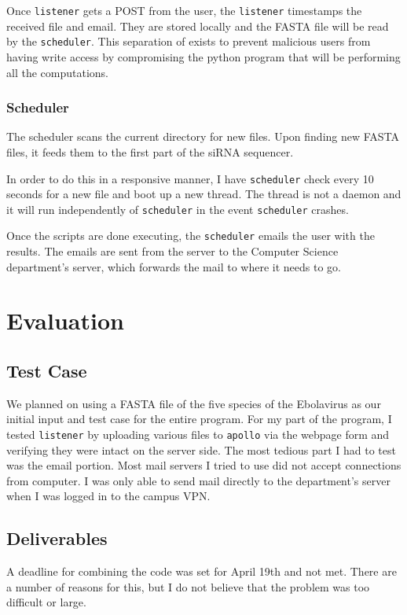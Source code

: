 \documentclass[10pt,letterpaper]{article}
\begin{document}
Once \texttt{listener} gets a POST from the user, the \texttt{listener} timestamps the received file and email.
They are stored locally and the FASTA file will be read by the \texttt{scheduler}.
This separation of exists to prevent malicious users from having write access by compromising the python program that will be performing all the computations.


\subsubsection{Scheduler}
The scheduler scans the current directory for new files.
Upon finding new FASTA files, it feeds them to the first part of the siRNA sequencer.

In order to do this in a responsive manner, I have \texttt{scheduler} check every 10 seconds for a new file and boot up a new thread.
The thread is not a daemon and it will run independently of \texttt{scheduler} in the event \texttt{scheduler} crashes.

Once the scripts are done executing, the \texttt{scheduler} emails the user with the results.
The emails are sent from the server to the Computer Science department's server, which forwards the mail to where it needs to go.



\section{Evaluation}

\subsection{Test Case}
We planned on using a FASTA file of the five species of the Ebolavirus as our initial input and test case for the entire program.
For my part of the program, I tested \texttt{listener} by uploading various files to \texttt{apollo} via the webpage form and verifying they were intact on the server side.
The most tedious part I had to test was the email portion. 
Most mail servers I tried to use did not accept connections from computer.
I was only able to send mail directly to the department's server when I was logged in to the campus VPN.

\subsection{Deliverables}
A deadline for combining the code was set for April 19th and not met.
There are a number of reasons for this, but I do not believe that the problem was too difficult or large.
\end{document}
